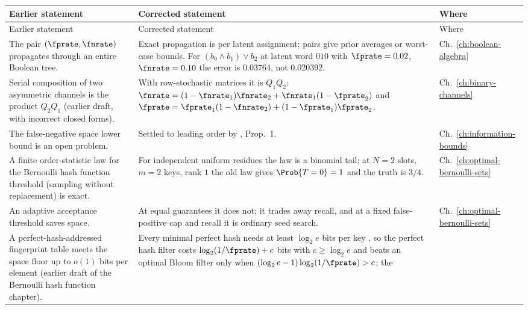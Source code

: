 \begingroup
\small
\renewcommand{\arraystretch}{1.15}
\begin{longtable}{@{}>{\raggedright\arraybackslash}p{}
                   >{\raggedright\arraybackslash}p{}
                   >{\raggedright\arraybackslash}p{}@{}}
\toprule
Earlier statement & Corrected statement & Where \\
\midrule
\endfirsthead
\toprule
Earlier statement & Corrected statement & Where \\
\midrule
\endhead
\bottomrule
\endfoot
The pair $(\fprate, \fnrate)$ propagates through an entire Boolean tree.
  & Exact propagation is per latent assignment; pairs give prior averages or
    worst-case bounds. For $(b_0 \wedge b_1) \vee b_2$ at latent word $010$
    with $\fprate = 0.02$, $\fnrate = 0.10$ the error is $0.03764$, not
    $0.020392$.
  & Ch.~\ref{ch:boolean-algebra} \\
Serial composition of two asymmetric channels is the product $Q_2 Q_1$
  (earlier draft, with incorrect closed forms).
  & With row-stochastic matrices it is $Q_1 Q_2$:
    $\fnrate = (1 - \fnrate_1)\fnrate_2 + \fnrate_1(1 - \fprate_2)$ and
    $\fprate = \fprate_1(1 - \fnrate_2) + (1 - \fprate_1)\fprate_2$.
  & Ch.~\ref{ch:binary-channels} \\
The false-negative space lower bound is an open problem.
  & Settled to leading order by \textcite{pagh-rodler-2001}, Prop.~1.
  & Ch.~\ref{ch:information-bounds} \\
A finite order-statistic law for the Bernoulli hash function threshold
  (sampling without replacement) is exact.
  & For independent uniform residues the law is a binomial tail; at $N = 2$
    slots, $m = 2$ keys, rank $1$ the old law gives $\Prob{T = 0} = 1$ and the
    truth is $3/4$.
  & Ch.~\ref{ch:optimal-bernoulli-sets} \\
An adaptive acceptance threshold saves space.
  & At equal guarantees it does not; it trades away recall, and at a fixed
    false-positive cap and recall it is ordinary seed search.
  & Ch.~\ref{ch:optimal-bernoulli-sets} \\
A perfect-hash-addressed fingerprint table meets the space floor up to
  $o(1)$ bits per element (earlier draft of the Bernoulli hash function
  chapter).
  & Every minimal perfect hash needs at least $\log_2 e$ bits per key
    \parencite{fredman-komlos-1984}, so the perfect hash filter costs
    $\log_2(1/\fprate) + c$ bits with $c \ge \log_2 e$ and beats an optimal
    Bloom filter only when $(\log_2 e - 1)\log_2(1/\fprate) > c$; the

\end{longtable}
